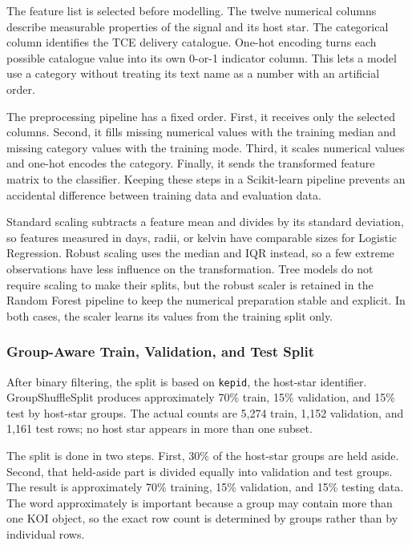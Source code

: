 \documentclass[oneside]{hcmut-report}
\begin{document}
The feature list is selected before modelling. The twelve numerical columns describe measurable properties of the signal and its host star. The categorical column identifies the TCE delivery catalogue. One-hot encoding turns each possible catalogue value into its own 0-or-1 indicator column. This lets a model use a category without treating its text name as a number with an artificial order.

The preprocessing pipeline has a fixed order. First, it receives only the selected columns. Second, it fills missing numerical values with the training median and missing category values with the training mode. Third, it scales numerical values and one-hot encodes the category. Finally, it sends the transformed feature matrix to the classifier. Keeping these steps in a Scikit-learn pipeline prevents an accidental difference between training data and evaluation data.

Standard scaling subtracts a feature mean and divides by its standard deviation, so features measured in days, radii, or kelvin have comparable sizes for Logistic Regression. Robust scaling uses the median and IQR instead, so a few extreme observations have less influence on the transformation. Tree models do not require scaling to make their splits, but the robust scaler is retained in the Random Forest pipeline to keep the numerical preparation stable and explicit. In both cases, the scaler learns its values from the training split only.

\subsubsection{Group-Aware Train, Validation, and Test Split}

After binary filtering, the split is based on \texttt{kepid}, the host-star identifier. GroupShuffleSplit produces approximately 70\% train, 15\% validation, and 15\% test by host-star groups. The actual counts are 5,274 train, 1,152 validation, and 1,161 test rows; no host star appears in more than one subset.

The split is done in two steps. First, 30\% of the host-star groups are held aside. Second, that held-aside part is divided equally into validation and test groups. The result is approximately 70\% training, 15\% validation, and 15\% testing data. The word approximately is important because a group may contain more than one KOI object, so the exact row count is determined by groups rather than by individual rows.
\end{document}

